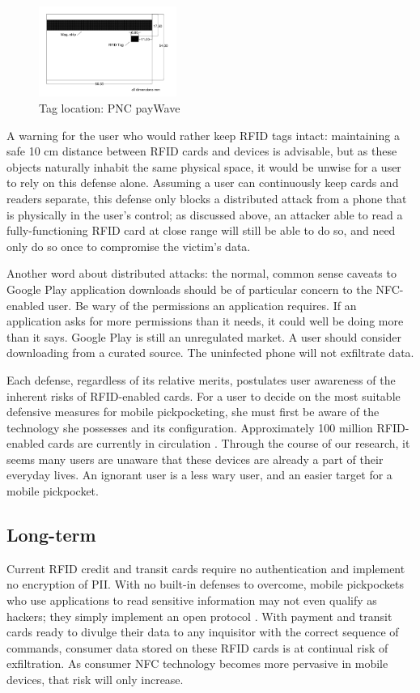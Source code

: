 \documentclass{sig-alternate}
\begin{document}
	\begin{figure}%
	  \centering
	  \includegraphics[width=0.4\textwidth]{images/RFID_chip_location.png}
	  \caption{Tag location: PNC payWave}
	  \label{fig:RFID_chip_location}
	\end{figure}

A warning for the user who would rather keep RFID tags intact: maintaining a safe 10 cm distance between RFID cards and devices is advisable, but as these objects naturally inhabit the same physical space, it would be unwise for a user to rely on this defense alone.  Assuming a user can continuously keep cards and readers separate, this defense only blocks a distributed attack from a phone that is physically in the user's control; as discussed above, an attacker able to read a fully-functioning RFID card at close range will still be able to do so, and need only do so once to compromise the victim's data.

Another word about distributed attacks: the normal, common sense caveats to Google Play application downloads should be of particular concern to the NFC-enabled user.  Be wary of the permissions an application requires.  If an application asks for more permissions than it needs, it could well be doing more than it says.  Google Play is still an unregulated market.  A user should consider downloading from a curated source.  The uninfected phone will not exfiltrate data.  

Each defense, regardless of its relative merits, postulates user awareness of the inherent risks of RFID-enabled cards.  For a user to decide on the most suitable defensive measures for mobile pickpocketing, she must first be aware of the technology she possesses and its configuration.  Approximately 100 million RFID-enabled cards are currently in circulation \cite{forbes-1}.  Through the course of our research, it seems many users are unaware that these devices are already a part of their everyday lives.  An ignorant user is a less wary user, and an easier target for a mobile pickpocket.

\subsection{Long-term}
Current RFID credit and transit cards require no authentication and implement no encryption of PII.  With no built-in defenses to overcome, mobile pickpockets who use applications to read sensitive information may not even qualify as hackers; they simply implement an open protocol \cite{bt-hacking-nfc-ccs}.  With payment and transit cards ready to divulge their data to any inquisitor with the correct sequence of commands, consumer data stored on these RFID cards is at continual risk of exfiltration.  As consumer NFC technology becomes more pervasive in mobile devices, that risk will only increase.
\end{document}
